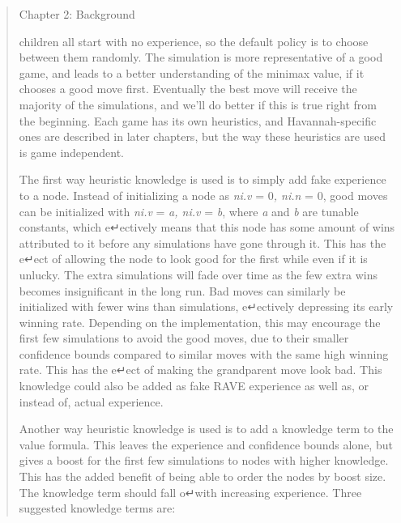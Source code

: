 \begin{quote}
Chapter 2: Background

children all start with no experience, so the default policy is to
choose between them randomly. The simulation is more representative of a
good game, and leads to a better understanding of the minimax value, if
it chooses a good move first. Eventually the best move will receive the
majority of the simulations, and we'll do better if this is true right
from the beginning. Each game has its own heuristics, and
Havannah-specific ones are described in later chapters, but the way
these heuristics are used is game independent.

The first way heuristic knowledge is used is to simply add fake
experience to a node. Instead of initializing a node as \emph{ni.v} =
0\emph{, ni.n} = 0, good moves can be initialized with \emph{ni.v} =
\emph{a, ni.v} = \emph{b}, where \emph{a} and \emph{b} are tunable
constants, which e↵ectively means that this node has some amount of wins
attributed to it before any simulations have gone through it. This has
the e↵ect of allowing the node to look good for the first while even if
it is unlucky. The extra simulations will fade over time as the few
extra wins becomes insignificant in the long run. Bad moves can
similarly be initialized with fewer wins than simulations, e↵ectively
depressing its early winning rate. Depending on the implementation, this
may encourage the first few simulations to avoid the good moves, due to
their smaller confidence bounds compared to similar moves with the same
high winning rate. This has the e↵ect of making the grandparent move
look bad. This knowledge could also be added as fake RAVE experience as
well as, or instead of, actual experience.

Another way heuristic knowledge is used is to add a knowledge term to
the value formula. This leaves the experience and confidence bounds
alone, but gives a boost for the first few simulations to nodes with
higher knowledge. This has the added benefit of being able to order the
nodes by boost size. The knowledge term should fall o↵with increasing
experience. Three suggested knowledge terms are:
\end{quote}

